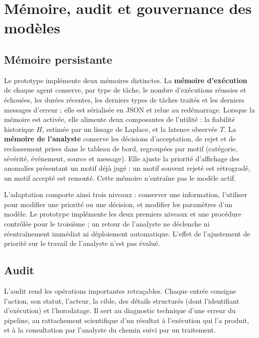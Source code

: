 \section{Mémoire, audit et gouvernance des modèles}

\label{sec:memoire-gouvernance}

\subsection{Mémoire persistante}

Le prototype implémente deux mémoires distinctes. La \textbf{mémoire d'exécution} de chaque agent conserve, par type de tâche, le nombre d'exécutions réussies et échouées, les durées récentes, les derniers types de tâches traités et les derniers messages d'erreur ; elle est sérialisée en JSON et relue au redémarrage. Lorsque la mémoire est activée, elle alimente deux composantes de l'utilité : la fiabilité historique $H$, estimée par un lissage de Laplace, et la latence observée $T$. La \textbf{mémoire de l'analyste} conserve les décisions d'acceptation, de rejet et de reclassement prises dans le tableau de bord, regroupées par motif (catégorie, sévérité, événement, source et message). Elle ajuste la priorité d'affichage des anomalies présentant un motif déjà jugé : un motif souvent rejeté est rétrogradé, un motif accepté est remonté. Cette mémoire n'entraîne pas le modèle actif.

L'adaptation comporte ainsi trois niveaux : conserver une information, l'utiliser pour modifier une priorité ou une décision, et modifier les paramètres d'un modèle. Le prototype implémente les deux premiers niveaux et une procédure contrôlée pour le troisième ; un retour de l'analyste ne déclenche ni réentraînement immédiat ni déploiement automatique. L'effet de l'ajustement de priorité sur le travail de l'analyste n'est pas évalué.

\subsection{Audit}

L'audit rend les opérations importantes retraçables. Chaque entrée consigne l'action, son statut, l'acteur, la cible, des détails structurés (dont l'identifiant d'exécution) et l'horodatage. Il sert au diagnostic technique d'une erreur du pipeline, au rattachement scientifique d'un résultat à l'exécution qui l'a produit, et à la consultation par l'analyste du chemin suivi par un traitement.

